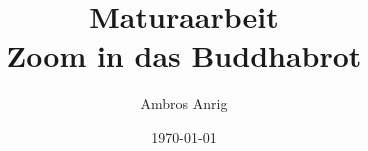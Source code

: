 

\title{Maturaarbeit \\ Zoom in das Buddhabrot}
\author{Ambros Anrig}
\date{\today}



\maketitle
\thispagestyle{empty}

\clearpage
\tableofcontents
\thispagestyle{empty}












